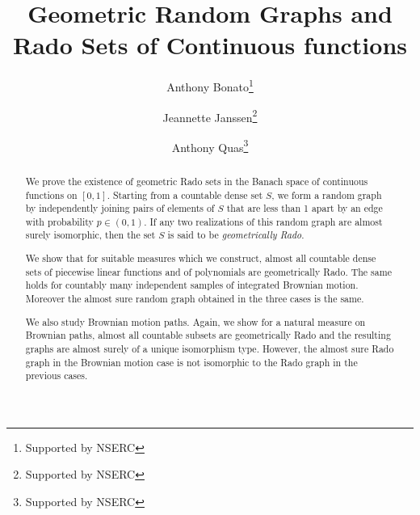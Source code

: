 \documentclass{daj}
\begin{document}
\begin{frontmatter}[classification=text]

\title{Geometric Random Graphs and Rado Sets of Continuous functions} %

\author[ab]{Anthony Bonato\thanks{Supported by NSERC}}
\author[jj]{Jeannette Janssen\thanks{Supported by NSERC}}
\author[AQ]{Anthony Quas\thanks{Supported by NSERC}}

\begin{abstract}
We prove the existence of geometric Rado sets in the Banach space of continuous functions on $[0,1]$.
Starting from a countable dense set $S$, we form a random graph by independently joining pairs of elements of $S$
that are less than 1 apart by an edge with probability $p\in(0,1)$. If any two realizations of this
random graph are almost surely isomorphic, then the set $S$ is said to be \emph{geometrically Rado}.

We show that for suitable measures which we construct, almost all countable dense sets
of piecewise linear functions and of polynomials are geometrically Rado. The same holds for
countably many independent samples of integrated Brownian motion.
Moreover the almost sure random graph obtained in the three cases is the same.

We also study Brownian motion paths. Again, we show for a natural measure on Brownian paths,
almost all countable subsets are geometrically Rado
and the resulting graphs are almost surely of a unique isomorphism type.
However, the almost sure Rado graph in the Brownian motion case is not isomorphic
to the Rado graph in the previous cases.
\end{abstract}
\end{frontmatter}

\end{document}
